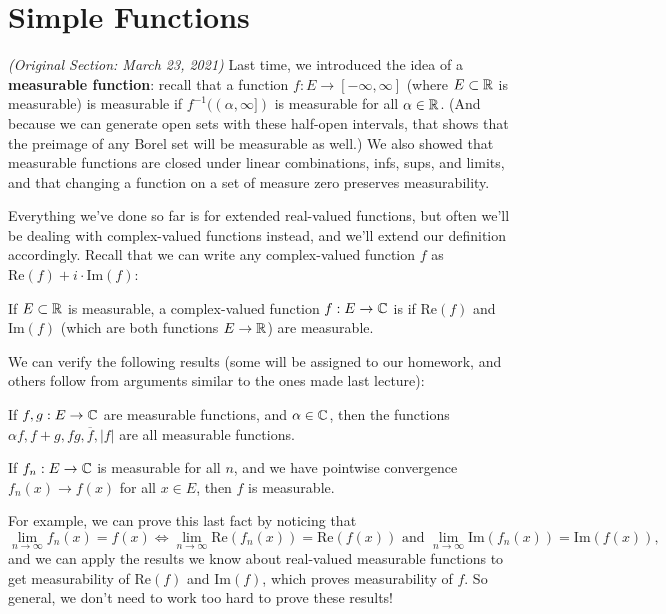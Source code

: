 \pagebreak\section{Simple Functions}
\textit{(Original Section: March 23, 2021)}
Last time, we introduced the idea of a \textbf{measurable function}: recall that a function $f: E \to [-\infty, \infty]$ (where $E \subset \mathbb R$ is measurable) is measurable if $f^{-1}((\alpha, \infty])$ is measurable for all $\alpha \in \mathbb R$. (And because we can generate open sets with these half-open intervals, that shows that the preimage of any Borel set will be measurable as well.) We also showed that measurable functions are closed under linear combinations, infs, sups, and limits, and that changing a function on a set of measure zero preserves measurability.

Everything we've done so far is for extended real-valued functions, but often we'll be dealing with complex-valued functions instead, and we'll extend our definition accordingly. Recall that we can write any complex-valued function $f$ as $\text{Re}(f) + i \cdot \text{Im}(f)$:

\begin{definition}
If $E \subset \mathbb R$ is measurable, a complex-valued function $f: E \to \mathbb C$ is  if $\text{Re}(f)$ and $\text{Im}(f)$ (which are both functions $E \to \mathbb R$) are measurable.
\end{definition}

We can verify the following results (some will be assigned to our homework, and others follow from arguments similar to the ones made last lecture):

\begin{theorem}\label{compmeaslincomb}
If $f, g: E \to \mathbb C$ are measurable functions, and $\alpha \in \mathbb C$, then the functions $\alpha f, f + g, fg, \overline{f}, |f|$ are all measurable functions.
\end{theorem}

\begin{theorem}
If $f_n: E \to \mathbb C$ is measurable for all $n$, and we have pointwise convergence $f_n(x) \to f(x)$ for all $x \in E$, then $f$ is measurable.
\end{theorem}

For example, we can prove this last fact by noticing that 
\[
    \lim_{n \to \infty} f_n(x) = f(x) \iff \lim_{n \to \infty} \text{Re}(f_n(x)) = \text{Re}(f(x)) \text{ and } \lim_{n \to \infty} \text{Im}(f_n(x)) = \text{Im}(f(x)),
\]  
and we can apply the results we know about real-valued measurable functions to get measurability of $\text{Re}(f)$ and $\text{Im}(f)$, which proves measurability of $f$. So general, we don't need to work too hard to prove these results!

